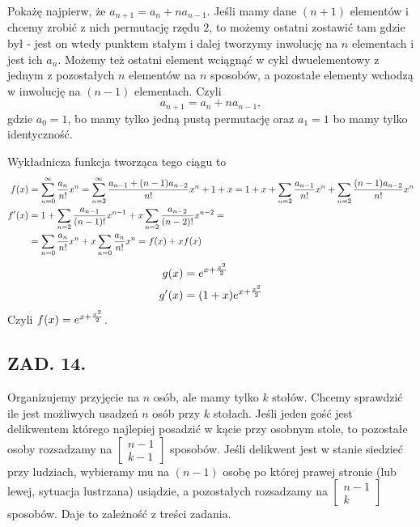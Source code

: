 \documentclass{article}[13pt]
\begin{document}
Pokażę najpierw, że $a_{n+1}=a_n+na_{n-1}$. Jeśli mamy dane $(n+1)$ elementów i chcemy zrobić z nich permutację rzędu $2$, to możemy ostatni zostawić tam gdzie był - jest on wtedy punktem stałym i dalej tworzymy inwolucję na $n$ elementach i jest ich $a_n$. Możemy też ostatni element wciągnąć w cykl dwuelementowy z jednym z pozostałych $n$ elementów na $n$ sposobów, a pozostałe elementy wchodzą w inwolucję na $(n-1)$ elementach. Czyli
$$a_{n+1}=a_n+na_{n-1},$$
gdzie $a_0=1$, bo mamy tylko jedną pustą permutację oraz $a_1=1$ bo mamy tylko identyczność.

Wykładnicza funkcja tworząca tego ciągu to
\begin{align*}
    f(x)&=\sum\limits_{n=0}^\infty {a_n\over n!}x^n=\sum\limits_{n=2}^\infty {a_{n-1}+(n-1)a_{n-2}\over n!}x^n+1+x=1+x+\sum\limits_{n=2}{a_{n-1}\over n!}x^n+\sum\limits_{n=2}{(n-1)a_{n-2}\over n!}x^n\\
    f'(x)&=1+\sum\limits_{n=2}{a_{n-1}\over(n-1)!}x^{n-1}+x\sum\limits_{n=2}{a_{n-2}\over (n-2)!}x^{n-2}=\\
    &=\sum\limits_{n=0}{a_n\over n!}x^n+x\sum\limits_{n=0}{a_n\over n!}x^n=f(x)+xf(x)
\end{align*}
\begin{align*}
    g(x)&=e^{x+{x^2\over2}}\\
    g'(x)&=(1+x)e^{x+{x^2\over2}}
\end{align*}
Czyli $f(x)=e^{x+{x^2\over2}}$.

\subsection*{ZAD. 14.}

Organizujemy przyjęcie na $n$ osób, ale mamy tylko $k$ stołów. Chcemy sprawdzić ile jest możliwych usadzeń $n$ osób przy $k$ stołach. Jeśli jeden gość jest delikwentem którego najlepiej posadzić w kącie przy osobnym stole, to pozostałe osoby rozsadzamy na $\begin{bmatrix}
    n-1\\k-1
\end{bmatrix}$ sposobów. Jeśli delikwent jest w stanie siedzieć przy ludziach, wybieramy mu na $(n-1)$ osobę po której prawej stronie (lub lewej, sytuacja lustrzana) usiądzie, a pozostałych rozsadzamy na $\begin{bmatrix}
    n-1\\k
\end{bmatrix}$ sposobów. Daje to zależność z treści zadania.
\end{document}
